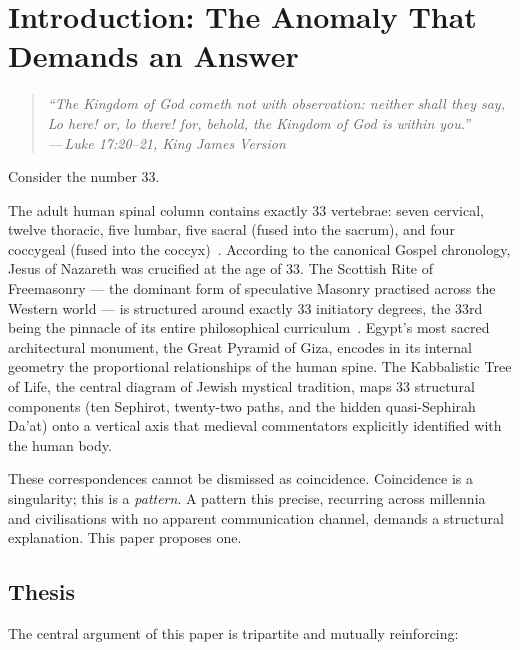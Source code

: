 \documentclass[12pt, a4paper]{article}
\newcommand{\epigraph}[2]{%
  \begin{quote}
    \itshape ``#1''\\[0.3em]
    \normalfont\small\hfill ---\,#2
  \end{quote}
}
\begin{document}
\newpage
\tableofcontents
\newpage

\section{Introduction: The Anomaly That Demands an Answer}

\epigraph{The Kingdom of God cometh not with observation: neither shall they
say, Lo here! or, lo there! for, behold, the Kingdom of God is within
you.}{Luke 17:20--21, King James Version}

Consider the number 33.

The adult human spinal column contains exactly 33 vertebrae: seven cervical,
twelve thoracic, five lumbar, five sacral (fused into the sacrum), and four
coccygeal (fused into the coccyx)~\autocite[97]{gray2016}. According to the
canonical Gospel chronology, Jesus of Nazareth was crucified at the age of
33. The Scottish Rite of Freemasonry — the dominant form of speculative
Masonry practised across the Western world — is structured around exactly 33
initiatory degrees, the 33rd being the pinnacle of its entire philosophical
curriculum~\autocite[860]{mackey1874}. Egypt's most sacred architectural
monument, the Great Pyramid of Giza, encodes in its internal geometry the
proportional relationships of the human spine. The Kabbalistic Tree of Life,
the central diagram of Jewish mystical tradition, maps 33 structural
components (ten Sephirot, twenty-two paths, and the hidden quasi-Sephirah
Da'at) onto a vertical axis that medieval commentators explicitly identified
with the human body.

These correspondences cannot be dismissed as coincidence. Coincidence is a
singularity; this is a \emph{pattern}. A pattern this precise, recurring
across millennia and civilisations with no apparent communication channel,
demands a structural explanation. This paper proposes one.

\subsection{Thesis}

The central argument of this paper is tripartite and mutually reinforcing:
\end{document}
